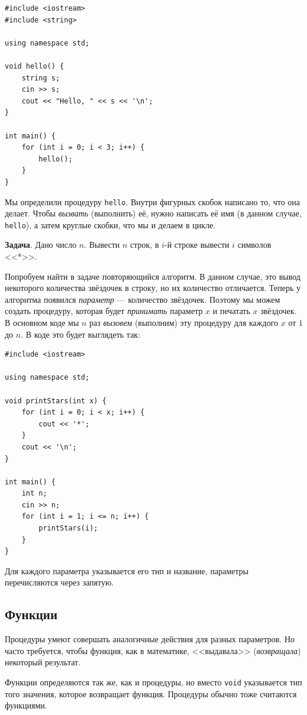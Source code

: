 \documentclass{article}
\newcommand{\task}[1]{\textbf{Задача}. #1}
\begin{document}
	\begin{lstlisting}
#include <iostream>
#include <string>

using namespace std;

void hello() {
	string s;
	cin >> s;
	cout << "Hello, " << s << '\n';
}

int main() {
	for (int i = 0; i < 3; i++) {
		hello();
	}
}
	\end{lstlisting}
	
	Мы определили процедуру \texttt{hello}. Внутри фигурных скобок написано то, что она делает. Чтобы \textit{вызвать} (выполнить) её, нужно написать её имя (в данном случае, \texttt{hello}), а затем круглые скобки, что мы и делаем в цикле.
	
	\task{Дано число $n$. Вывести $n$ строк, в $i$-й строке вывести $i$ символов <<*>>.}
	
	Попробуем найти в задаче повторяющийся алгоритм. В данном случае, это вывод некоторого количества звёздочек в строку, но их количество отличается. Теперь у алгоритма появился \textit{параметр} --- количество звёздочек. Поэтому мы можем создать процедуру, которая будет \textit{принимать} параметр $x$ и печатать $x$ звёздочек. В основном коде мы $n$ раз \textit{вызовем} (выполним) эту процедуру для каждого $x$ от $1$ до $n$. В коде это будет выглядеть так:
	
	\begin{lstlisting}
#include <iostream>

using namespace std;

void printStars(int x) {
	for (int i = 0; i < x; i++) {
		cout << '*';
	}
	cout << '\n';
}

int main() {
	int n;
	cin >> n;
	for (int i = 1; i <= n; i++) {
		printStars(i);
	}
}
	\end{lstlisting}
	
	Для каждого параметра указывается его тип и название, параметры перечисляются через запятую.

	\subsection{Функции}

	Процедуры умеют совершать аналогичные действия для разных параметров. Но часто требуется, чтобы функция, как в математике, <<выдавала>> (\textit{возвращала}) некоторый результат.

	Функции определяются так же, как и процедуры, но вместо \texttt{void} указывается тип того значения, которое возвращает функция. Процедуры обычно тоже считаются функциями.
\end{document}
